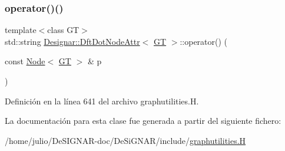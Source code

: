 \subsubsection{\texorpdfstring{operator()()}{operator()()}}
{\footnotesize\ttfamily template$<$class GT$>$ \\
std\+::string \hyperlink{class_designar_1_1_dft_dot_node_attr}{Designar\+::\+Dft\+Dot\+Node\+Attr}$<$ \hyperlink{demo-buildgraph_8_c_a3001c40d2c31ca87ed96cd7d1334a55e}{GT} $>$\+::operator() (\begin{DoxyParamCaption}\item[{const \hyperlink{namespace_designar_a5af326c65aa2bd26b26c410f2030d09e}{Node}$<$ \hyperlink{demo-buildgraph_8_c_a3001c40d2c31ca87ed96cd7d1334a55e}{GT} $>$ \&}]{p }\end{DoxyParamCaption})\hspace{0.3cm}{\ttfamily [inline]}}



Definición en la línea 641 del archivo graphutilities.\+H.



La documentación para esta clase fue generada a partir del siguiente fichero\+:\begin{DoxyCompactItemize}
\item 
/home/julio/\+De\+S\+I\+G\+N\+A\+R-\/doc/\+De\+Si\+G\+N\+A\+R/include/\hyperlink{graphutilities_8_h}{graphutilities.\+H}\end{DoxyCompactItemize}
